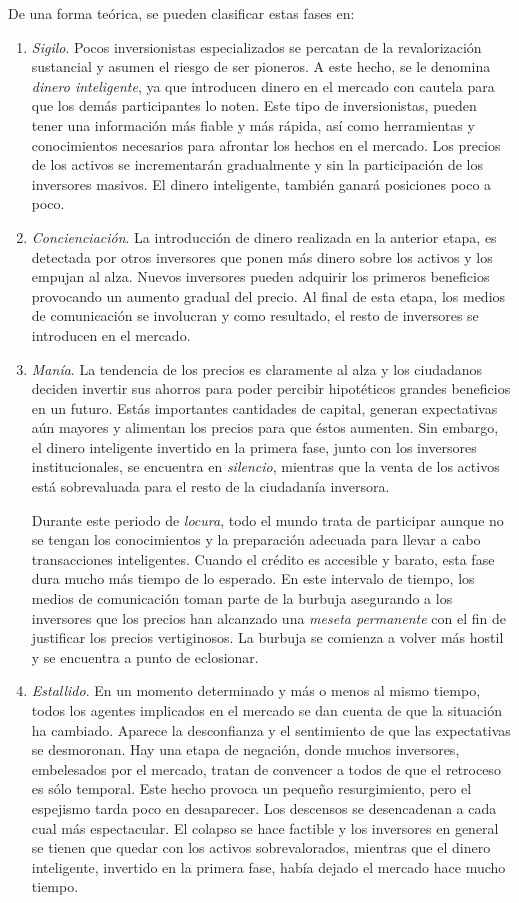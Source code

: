 De una forma teórica, se pueden clasificar estas fases en:
\begin{enumerate}
	\item \emph{Sigilo}. Pocos inversionistas especializados se percatan de la revalorización sustancial y asumen el riesgo de ser pioneros. A este hecho, se le denomina \emph{dinero inteligente}, ya que introducen dinero en el mercado con cautela para que los demás participantes lo noten. Este tipo de inversionistas, pueden tener una información más fiable y más rápida, así como herramientas y conocimientos necesarios para afrontar los hechos en el mercado. Los precios de los activos se incrementarán gradualmente y sin la participación de los inversores masivos. El dinero inteligente, también ganará posiciones poco a poco.
	\item \emph{Concienciación}. La introducción de dinero realizada en la anterior etapa, es detectada por otros inversores que ponen más dinero sobre los activos y los empujan al alza. Nuevos inversores pueden adquirir los primeros beneficios provocando un aumento gradual del precio. Al final de esta etapa, los medios de comunicación se involucran y como resultado, el resto de inversores se introducen en el mercado. 
	\item \emph{Manía}. La tendencia de los precios es claramente al alza y los ciudadanos deciden invertir sus ahorros para poder percibir hipotéticos grandes beneficios en un futuro. Estás importantes cantidades de capital, generan expectativas aún mayores y alimentan los precios para que éstos aumenten. Sin embargo, el dinero inteligente invertido en la primera fase, junto con los inversores institucionales, se encuentra en \emph{silencio}, mientras que la venta de los activos está sobrevaluada para el resto de la ciudadanía inversora.

	Durante este periodo de \emph{locura}, todo el mundo trata de participar aunque no se tengan los conocimientos y la preparación adecuada para llevar a cabo transacciones inteligentes. Cuando el crédito es accesible y barato, esta fase dura mucho más tiempo de lo esperado. En este intervalo de tiempo, los medios de comunicación toman parte de la burbuja asegurando a los inversores que los precios han alcanzado una \emph{meseta permanente} con el fin de justificar los precios vertiginosos. La burbuja se comienza a volver más hostil y se encuentra a punto de eclosionar. 
	\item \emph{Estallido}. En un momento determinado y más o menos al mismo tiempo, todos los agentes implicados en el mercado se dan cuenta de que la situación ha cambiado. Aparece la desconfianza y el sentimiento de que las expectativas se desmoronan. Hay una etapa de negación, donde muchos inversores, embelesados por el mercado, tratan de convencer a todos de que el retroceso es sólo temporal. Este hecho provoca un pequeño resurgimiento, pero el espejismo tarda poco en desaparecer. Los descensos se desencadenan a cada cual más espectacular. El colapso se hace factible y los inversores en general se tienen que quedar con los activos sobrevalorados, mientras que el dinero inteligente, invertido en la primera fase, había dejado el mercado hace mucho tiempo. 
	

\end{enumerate}
